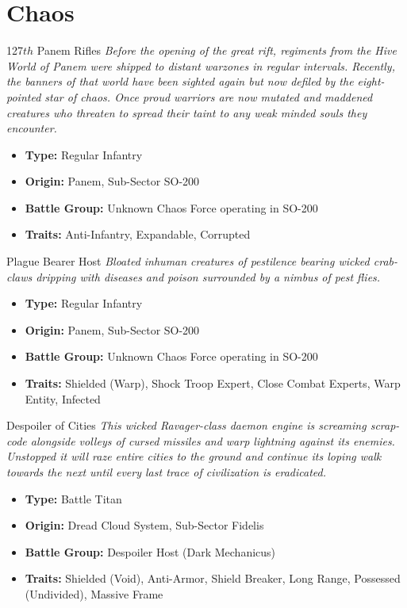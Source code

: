 \section{Chaos}
\begin{DndSidebar}{127${th}$ Panem Rifles}
\textit{Before the opening of the great rift, regiments from the Hive World of Panem were shipped to distant warzones in regular intervals. Recently, the banners of that world have been sighted again but now defiled by the eight-pointed star of chaos. Once proud warriors are now mutated and maddened creatures who threaten to spread their taint to any weak minded souls they encounter.}
\begin{itemize}
	\item \textbf{Type:} Regular Infantry
	\item \textbf{Origin:} Panem, Sub-Sector SO-200
	\item \textbf{Battle Group:} Unknown Chaos Force operating in SO-200
	\item \textbf{Traits:} Anti-Infantry, Expandable, Corrupted
\end{itemize}
\end{DndSidebar}

\begin{DndSidebar}{Plague Bearer Host}
\textit{Bloated inhuman creatures of pestilence bearing wicked crab-claws dripping with diseases and poison surrounded by a nimbus of pest flies.}
\begin{itemize}
	\item \textbf{Type:} Regular Infantry
	\item \textbf{Origin:} Panem, Sub-Sector SO-200
	\item \textbf{Battle Group:} Unknown Chaos Force operating in SO-200
	\item \textbf{Traits:} Shielded (Warp), Shock Troop Expert, Close Combat Experts, Warp Entity, Infected
\end{itemize}
\end{DndSidebar}

\begin{DndSidebar}{Despoiler of Cities}
\textit{This wicked Ravager-class daemon engine is screaming scrap-code alongside volleys of cursed missiles and warp lightning against its enemies. Unstopped it will raze entire cities to the ground and continue its loping walk towards the next until every last trace of civilization is eradicated.}
\begin{itemize}
	\item \textbf{Type:} Battle Titan
	\item \textbf{Origin:} Dread Cloud System, Sub-Sector Fidelis
	\item \textbf{Battle Group:} Despoiler Host (Dark Mechanicus)
	\item \textbf{Traits:} Shielded (Void), Anti-Armor, Shield Breaker, Long Range, Possessed (Undivided), Massive Frame
\end{itemize}
\end{DndSidebar}